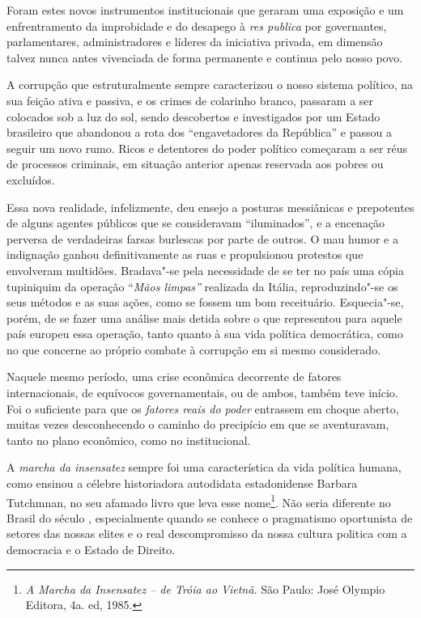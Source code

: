 Foram estes novos instrumentos institucionais que geraram uma exposição
e um enfrentramento da improbidade e do desapego à \emph{res publica}
por governantes, parlamentares, administradores e líderes da iniciativa
privada, em dimensão talvez nunca antes vivenciada de forma permanente e
continua pelo nosso povo.

A corrupção que estruturalmente sempre caracterizou o nosso sistema
político, na sua feição ativa e passiva, e os crimes de colarinho
branco, passaram a ser colocados sob a luz do sol, sendo descobertos e
investigados por um Estado brasileiro que abandonou a rota dos
``engavetadores da República'' e passou a seguir um novo rumo. Ricos e
detentores do poder político começaram a ser réus de processos
criminais, em situação anterior apenas reservada aos pobres ou
excluídos.

Essa nova realidade, infelizmente, deu ensejo a posturas messiânicas e
prepotentes de alguns agentes públicos que se consideravam
``iluminados'', e a encenação perversa de verdadeiras farsas burlescas
por parte de outros. O mau humor e a indignação ganhou definitivamente
as ruas e propulsionou protestos que envolveram multidões. Bradava"-se
pela necessidade de se ter no país uma cópia tupiniquim da operação
``\emph{Mãos limpas''} realizada da Itália, reproduzindo"-se os seus
métodos e as suas ações, como se fossem um bom receituário. Esquecia"-se,
porém, de se fazer uma análise mais detida sobre o que representou para
aquele país europeu essa operação, tanto quanto à sua vida política
democrática, como no que concerne ao próprio combate à corrupção em si
mesmo considerado.

Naquele mesmo período, uma crise econômica decorrente de fatores
internacionais, de equívocos governamentais, ou de ambos, também teve
início. Foi o suficiente para que os \emph{fatores reais do poder}
entrassem em choque aberto, muitas vezes desconhecendo o caminho do
precipício em que se aventuravam, tanto no plano econômico, como no
institucional.

A \emph{marcha da insensatez} sempre foi uma característica da vida
política humana, como ensinou a célebre historiadora autodidata
estadonidense Barbara Tutchmnan, no seu afamado livro que leva esse
nome\footnote{\emph{A Marcha da Insensatez -- de Tróia ao Vietnã.} São
  Paulo: José Olympio Editora, 4a. ed, 1985.}. Não seria diferente no
Brasil do século , especialmente quando se conhece o pragmatismo
oportunista de setores das nossas elites e o real descompromisso da
nossa cultura politica com a democracia e o Estado de Direito.

